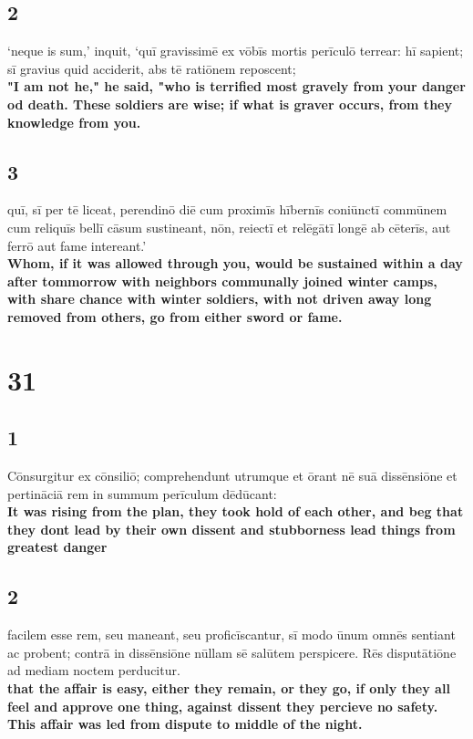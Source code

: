 \documentclass{article}
\begin{document}
\subsection*{2}
‘neque is sum,’ inquit, ‘quī gravissimē ex vōbīs mortis perīculō terrear: hī sapient; sī gravius quid acciderit, abs tē ratiōnem reposcent; \\
\textbf{"I am not he," he said, "who is terrified most gravely from your danger od death. These soldiers are wise; if what is graver occurs, from they knowledge from you.}

\subsection*{3}
quī, sī per tē liceat, perendinō diē cum proximīs hībernīs coniūnctī commūnem cum reliquīs bellī cāsum sustineant, nōn, reiectī et relēgātī longē ab cēterīs, aut ferrō aut fame intereant.’\\
\textbf{Whom, if it was allowed through you, would be sustained within a day after tommorrow with neighbors communally joined winter camps, with share chance with winter soldiers, with not driven away long removed from others, go from either sword or fame. }

\section*{31}

\subsection*{1}
Cōnsurgitur ex cōnsiliō; comprehendunt utrumque et ōrant nē suā dissēnsiōne et pertināciā rem in summum perīculum dēdūcant: \\
\textbf{It was rising from the plan, they took hold of each other, and beg that they dont lead by their own dissent and stubborness lead things from greatest danger}

\subsection*{2}
facilem esse rem, seu maneant, seu proficīscantur, sī modo ūnum omnēs sentiant ac probent; contrā in dissēnsiōne nūllam sē salūtem perspicere. Rēs disputātiōne ad mediam noctem perducitur. \\
\textbf{that the affair is easy, either they remain, or they go, if only they all feel and approve one thing, against dissent they percieve no safety. This affair was led from dispute to middle of the night.}
\end{document}

